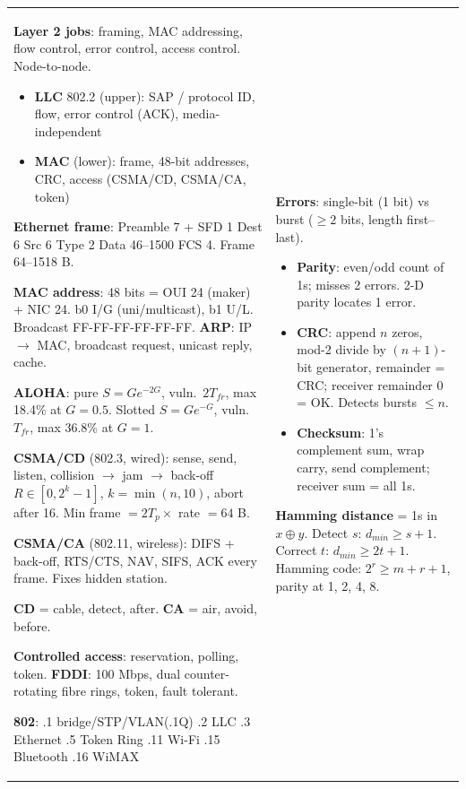 \documentclass[10pt]{article}
\begin{document}
\newpage
\begin{cheatsheet}
\small
\begin{tabularx}{\linewidth}{@{}XX@{}}
\textbf{Layer 2 jobs}: framing, MAC addressing, flow control, error control, access control. Node-to-node.
\begin{itemize}
\item \textbf{LLC} 802.2 (upper): SAP / protocol ID, flow, error control (ACK), media-independent
\item \textbf{MAC} (lower): frame, 48-bit addresses, CRC, access (CSMA/CD, CSMA/CA, token)
\end{itemize}
\textbf{Ethernet frame}: Preamble 7 + SFD 1 \textbar{} Dest 6 \textbar{} Src 6 \textbar{} Type 2 \textbar{} Data 46--1500 \textbar{} FCS 4. Frame 64--1518 B.

\textbf{MAC address}: 48 bits = OUI 24 (maker) + NIC 24. b0 I/G (uni/multicast), b1 U/L. Broadcast FF-FF-FF-FF-FF-FF. \textbf{ARP}: IP $\to$ MAC, broadcast request, unicast reply, cache.

\textbf{ALOHA}: pure $S = Ge^{-2G}$, vuln.\ $2T_{fr}$, max 18.4\% at $G=0.5$. Slotted $S = Ge^{-G}$, vuln.\ $T_{fr}$, max 36.8\% at $G=1$.

\textbf{CSMA/CD} (802.3, wired): sense, send, listen, collision $\to$ jam $\to$ back-off $R\in[0,2^k-1]$, $k=\min(n,10)$, abort after 16. Min frame $= 2T_p \times$ rate $= 64$ B.

\textbf{CSMA/CA} (802.11, wireless): DIFS + back-off, RTS/CTS, NAV, SIFS, ACK every frame. Fixes hidden station.

\textbf{CD} = cable, detect, after. \textbf{CA} = air, avoid, before.

\textbf{Controlled access}: reservation, polling, token. \textbf{FDDI}: 100 Mbps, dual counter-rotating fibre rings, token, fault tolerant.

\textbf{802}: .1 bridge/STP/VLAN(.1Q) .2 LLC .3 Ethernet .5 Token Ring .11 Wi-Fi .15 Bluetooth .16 WiMAX
&
\textbf{Errors}: single-bit (1 bit) vs burst ($\ge 2$ bits, length first--last).
\begin{itemize}
\item \textbf{Parity}: even/odd count of 1s; misses 2 errors. 2-D parity locates 1 error.
\item \textbf{CRC}: append $n$ zeros, mod-2 divide by $(n+1)$-bit generator, remainder = CRC; receiver remainder 0 = OK. Detects bursts $\le n$.
\item \textbf{Checksum}: 1's complement sum, wrap carry, send complement; receiver sum = all 1s.
\end{itemize}
\textbf{Hamming distance} = 1s in $x \oplus y$. Detect $s$: $d_{min} \ge s+1$. Correct $t$: $d_{min} \ge 2t+1$. Hamming code: $2^r \ge m + r + 1$, parity at 1, 2, 4, 8.


\end{tabularx}
\end{cheatsheet}
\end{document}
